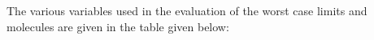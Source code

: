 The various variables used in the evaluation of the worst case limits and molecules are given in the table given below:\relax